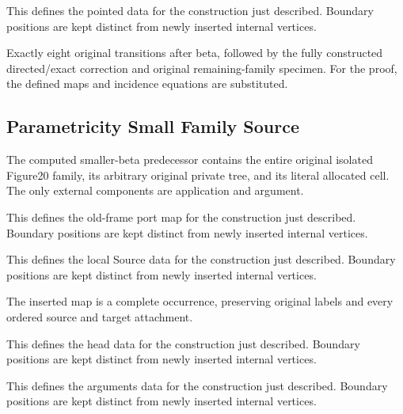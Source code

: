 This defines the pointed data for the construction just described. Boundary positions are kept distinct from newly inserted internal vertices.
\par{}

Exactly eight original transitions after beta, followed by the fully constructed directed/exact correction and original remaining-family specimen.
For the proof, the defined maps and incidence equations are substituted.
\par{}

\subsection{Parametricity Small Family Source}
The computed smaller-beta predecessor contains the entire original isolated Figure20 family, its arbitrary original private tree, and its literal allocated cell. The only external components are application and argument.

This defines the old-frame port map for the construction just described. Boundary positions are kept distinct from newly inserted internal vertices.
\par{}

This defines the local Source data for the construction just described. Boundary positions are kept distinct from newly inserted internal vertices.
\par{}

The inserted map is a complete occurrence, preserving original labels and every ordered source and target attachment.
\par{}

This defines the head data for the construction just described. Boundary positions are kept distinct from newly inserted internal vertices.
\par{}

This defines the arguments data for the construction just described. Boundary positions are kept distinct from newly inserted internal vertices.
\par{}

